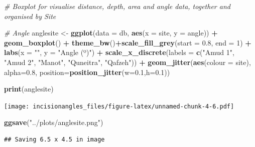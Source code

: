 \documentclass[
]{article}
\newenvironment{Shaded}{\begin{snugshade}}{\end{snugshade}}
\newcommand{\AttributeTok}[1]{\textcolor[rgb]{0.13,0.29,0.53}{#1}}
\newcommand{\CommentTok}[1]{\textcolor[rgb]{0.56,0.35,0.01}{\textit{#1}}}
\newcommand{\DecValTok}[1]{\textcolor[rgb]{0.00,0.00,0.81}{#1}}
\newcommand{\FloatTok}[1]{\textcolor[rgb]{0.00,0.00,0.81}{#1}}
\newcommand{\FunctionTok}[1]{\textcolor[rgb]{0.13,0.29,0.53}{\textbf{#1}}}
\newcommand{\NormalTok}[1]{#1}
\newcommand{\OtherTok}[1]{\textcolor[rgb]{0.56,0.35,0.01}{#1}}
\newcommand{\SpecialCharTok}[1]{\textcolor[rgb]{0.81,0.36,0.00}{\textbf{#1}}}
\newcommand{\StringTok}[1]{\textcolor[rgb]{0.31,0.60,0.02}{#1}}
\begin{document}
\begin{Shaded}
\begin{Highlighting}[]
\CommentTok{\# Boxplot for visualise distance, depth, area and angle data, together and organised by Site}

\CommentTok{\# Angle}
\NormalTok{anglesite }\OtherTok{\textless{}{-}} \FunctionTok{ggplot}\NormalTok{(}\AttributeTok{data =}\NormalTok{ db, }\FunctionTok{aes}\NormalTok{(}\AttributeTok{x =}\NormalTok{ site, }\AttributeTok{y =}\NormalTok{ angle)) }\SpecialCharTok{+}  
            \FunctionTok{geom\_boxplot}\NormalTok{() }\SpecialCharTok{+}
           \FunctionTok{theme\_bw}\NormalTok{()}\SpecialCharTok{+}\FunctionTok{scale\_fill\_grey}\NormalTok{(}\AttributeTok{start =} \FloatTok{0.8}\NormalTok{, }\AttributeTok{end =} \DecValTok{1}\NormalTok{) }\SpecialCharTok{+}
           \FunctionTok{labs}\NormalTok{(}\AttributeTok{x =} \StringTok{""}\NormalTok{, }\AttributeTok{y =} \StringTok{"Angle (º)"}\NormalTok{) }\SpecialCharTok{+}
           \FunctionTok{scale\_x\_discrete}\NormalTok{(}\AttributeTok{labels =} \FunctionTok{c}\NormalTok{(}\StringTok{"Amud 1"}\NormalTok{, }\StringTok{"Amud 2"}\NormalTok{, }\StringTok{"Manot"}\NormalTok{, }\StringTok{"Quneitra"}\NormalTok{, }\StringTok{"Qafzeh"}\NormalTok{)) }\SpecialCharTok{+}
           \FunctionTok{geom\_jitter}\NormalTok{(}\FunctionTok{aes}\NormalTok{(}\AttributeTok{colour =}\NormalTok{ site), }\AttributeTok{alpha=}\FloatTok{0.8}\NormalTok{, }\AttributeTok{position=}\FunctionTok{position\_jitter}\NormalTok{(}\AttributeTok{w=}\FloatTok{0.1}\NormalTok{,}\AttributeTok{h=}\FloatTok{0.1}\NormalTok{))}

\FunctionTok{print}\NormalTok{(anglesite)}
\end{Highlighting}
\end{Shaded}

\texttt{[image: incisionangles\_files/figure-latex/unnamed-chunk-4-6.pdf]}

\begin{Shaded}
\begin{Highlighting}[]
\FunctionTok{ggsave}\NormalTok{(}\StringTok{"../plots/anglesite.png"}\NormalTok{)}
\end{Highlighting}
\end{Shaded}

\begin{verbatim}
## Saving 6.5 x 4.5 in image
\end{verbatim}
\end{document}
